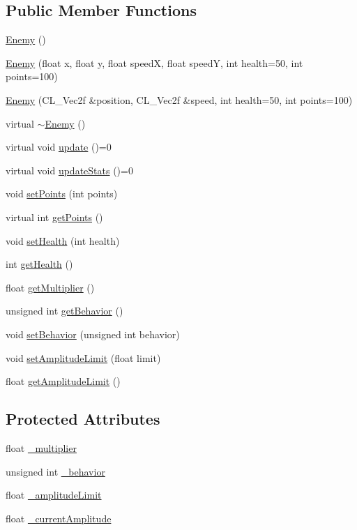 \subsection*{Public Member Functions}
\begin{DoxyCompactItemize}
\item 
\hyperlink{class_enemy_a94f30d348b6d2840fd71675472ba38dd}{Enemy} ()
\item 
\hyperlink{class_enemy_a5c78135be747dcb15ac30342da817598}{Enemy} (float x, float y, float speedX, float speedY, int health=50, int points=100)
\item 
\hyperlink{class_enemy_a8f13c84c25adf7f0aea049d0d52f4e0e}{Enemy} (CL\_\-Vec2f \&position, CL\_\-Vec2f \&speed, int health=50, int points=100)
\item 
virtual \hyperlink{class_enemy_ac0eec4755e28c02688065f9657150ac3}{$\sim$Enemy} ()
\item 
virtual void \hyperlink{class_enemy_ad3187ead8c132957d3123a64ff5977d6}{update} ()=0
\item 
virtual void \hyperlink{class_enemy_aacf879e206cf65f3a6eef441539ab79a}{updateStats} ()=0
\item 
void \hyperlink{class_enemy_a415ec24ecd55de8b1a3e6c7eb15be7ef}{setPoints} (int points)
\item 
virtual int \hyperlink{class_enemy_a5e0122fd418463449c03131663f81a1b}{getPoints} ()
\item 
void \hyperlink{class_enemy_a48f9331e93449f27c8d6374c75c81363}{setHealth} (int health)
\item 
int \hyperlink{class_enemy_a46341636350ca2bc6aac929b2a84f215}{getHealth} ()
\item 
float \hyperlink{class_enemy_a44aea16416a79f0e2152f0fd109c0d97}{getMultiplier} ()
\item 
unsigned int \hyperlink{class_enemy_a3d8b091cf6da7be89f75eab556cf5e8a}{getBehavior} ()
\item 
void \hyperlink{class_enemy_ad7d6519a6663730c8efe612b050e2497}{setBehavior} (unsigned int behavior)
\item 
void \hyperlink{class_enemy_a20b47e28e5abb3712161aa579f436185}{setAmplitudeLimit} (float limit)
\item 
float \hyperlink{class_enemy_aae76587ef1760daf0a854c0efc5231f5}{getAmplitudeLimit} ()
\end{DoxyCompactItemize}
\subsection*{Protected Attributes}
\begin{DoxyCompactItemize}
\item 
float \hyperlink{class_enemy_a406a6763891be117437959060c9c1fba}{\_\-multiplier}
\item 
unsigned int \hyperlink{class_enemy_a4d3938717ffc4bd2078e9033490d3b8f}{\_\-behavior}
\item 
float \hyperlink{class_enemy_ae05acccfefed105855fa5a7461785757}{\_\-amplitudeLimit}
\item 
float \hyperlink{class_enemy_aa3a2a0d5590a8acae7b387aa0e19eacd}{\_\-currentAmplitude}
\end{DoxyCompactItemize}


